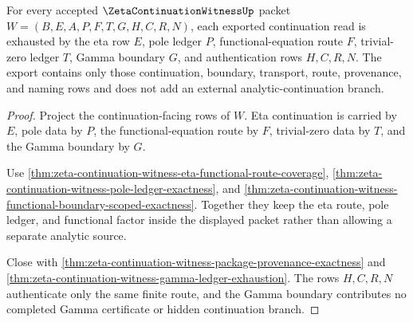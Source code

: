 \begin{theorem}
\label{thm:zeta-continuation-witness-eta-pole-functional-coverage}
For every accepted $\ZetaContinuationWitnessUp$ packet $W=(B,E,A,P,F,T,G,H,C,R,N)$, each exported continuation read is exhausted by the eta row $E$, pole ledger $P$, functional-equation route $F$, trivial-zero ledger $T$, Gamma boundary $G$, and authentication rows $H,C,R,N$. The export contains only those continuation, boundary, transport, route, provenance, and naming rows and does not add an external analytic-continuation branch.
\end{theorem}
\begin{proof}
Project the continuation-facing rows of $W$. Eta continuation is carried by $E$, pole data by $P$, the functional-equation route by $F$, trivial-zero data by $T$, and the Gamma boundary by $G$.

Use \autoref{thm:zeta-continuation-witness-eta-functional-route-coverage}, \autoref{thm:zeta-continuation-witness-pole-ledger-exactness}, and \autoref{thm:zeta-continuation-witness-functional-boundary-scoped-exactness}. Together they keep the eta route, pole ledger, and functional factor inside the displayed packet rather than allowing a separate analytic source.

Close with \autoref{thm:zeta-continuation-witness-package-provenance-exactness} and \autoref{thm:zeta-continuation-witness-gamma-ledger-exhaustion}. The rows $H,C,R,N$ authenticate only the same finite route, and the Gamma boundary contributes no completed Gamma certificate or hidden continuation branch.
\end{proof}

